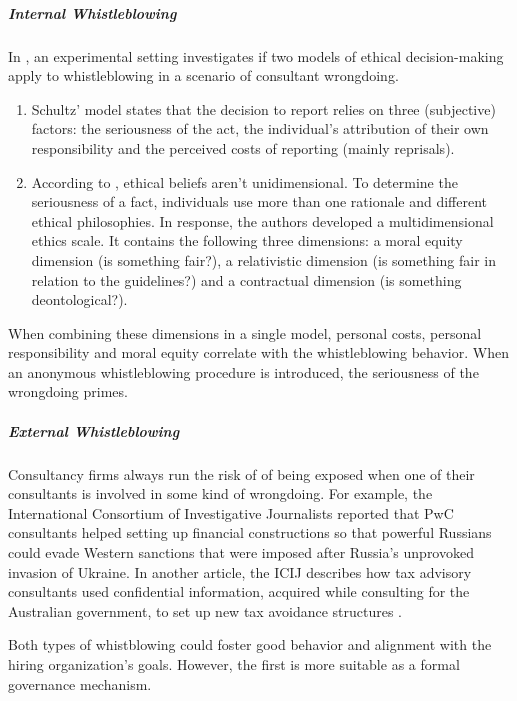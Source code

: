 \documentclass[12pt]{article}
\providecommand{\tightlist}{%
  \setlength{\itemsep}{0pt}\setlength{\parskip}{0pt}}
\begin{document}
\subparagraph{Internal Whistleblowing}\label{internal-whistleblowing}

In \citet{ayers2005}, an experimental setting investigates if two models
of ethical decision-making apply to whistleblowing in a scenario of
consultant wrongdoing.

\begin{enumerate}
\def\labelenumi{\arabic{enumi}.}
\tightlist
\item
  Schultz' \citep{schultz1993} model states that the decision to report
  relies on three (subjective) factors: the seriousness of the act, the
  individual's attribution of their own responsibility and the perceived
  costs of reporting (mainly reprisals).
\item
  According to \citep{reidenbach1990}, ethical beliefs aren't
  unidimensional. To determine the seriousness of a fact, individuals
  use more than one rationale and different ethical philosophies. In
  response, the authors developed a multidimensional ethics scale. It
  contains the following three dimensions: a moral equity dimension (is
  something fair?), a relativistic dimension (is something fair in
  relation to the guidelines?) and a contractual dimension (is something
  deontological?).
\end{enumerate}

When combining these dimensions in a single model, personal costs,
personal responsibility and moral equity correlate with the
whistleblowing behavior. When an anonymous whistleblowing procedure is
introduced, the seriousness of the wrongdoing primes.

\subparagraph{External Whistleblowing}\label{external-whistleblowing}

Consultancy firms always run the risk of of being exposed when one of
their consultants is involved in some kind of wrongdoing. For example,
the International Consortium of Investigative Journalists
\citep{icij20231} reported that PwC consultants helped setting up
financial constructions so that powerful Russians could evade Western
sanctions that were imposed after Russia's unprovoked invasion of
Ukraine. In another article, the ICIJ describes how tax advisory
consultants used confidential information, acquired while consulting for
the Australian government, to set up new tax avoidance structures
\citep{icij20232}.

Both types of whistblowing could foster good behavior and alignment with
the hiring organization's goals. However, the first is more suitable as
a formal governance mechanism.
\end{document}
